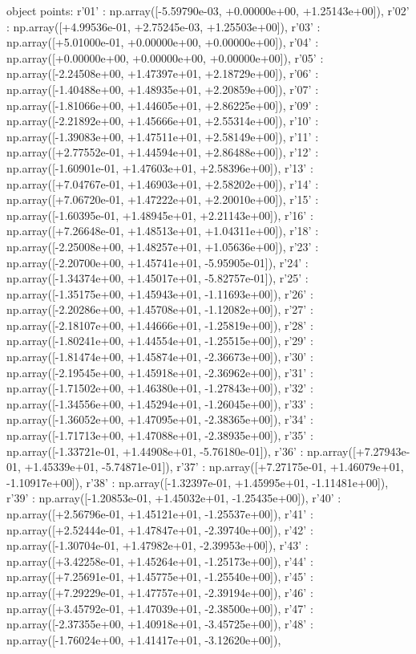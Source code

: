 object points:
r'01' : np.array([-5.59790e-03, +0.00000e+00, +1.25143e+00]),
r'02' : np.array([+4.99536e-01, +2.75245e-03, +1.25503e+00]),
r'03' : np.array([+5.01000e-01, +0.00000e+00, +0.00000e+00]),
r'04' : np.array([+0.00000e+00, +0.00000e+00, +0.00000e+00]),
r'05' : np.array([-2.24508e+00, +1.47397e+01, +2.18729e+00]),
r'06' : np.array([-1.40488e+00, +1.48935e+01, +2.20859e+00]),
r'07' : np.array([-1.81066e+00, +1.44605e+01, +2.86225e+00]),
r'09' : np.array([-2.21892e+00, +1.45666e+01, +2.55314e+00]),
r'10' : np.array([-1.39083e+00, +1.47511e+01, +2.58149e+00]),
r'11' : np.array([+2.77552e-01, +1.44594e+01, +2.86488e+00]),
r'12' : np.array([-1.60901e-01, +1.47603e+01, +2.58396e+00]),
r'13' : np.array([+7.04767e-01, +1.46903e+01, +2.58202e+00]),
r'14' : np.array([+7.06720e-01, +1.47222e+01, +2.20010e+00]),
r'15' : np.array([-1.60395e-01, +1.48945e+01, +2.21143e+00]),
r'16' : np.array([+7.26648e-01, +1.48513e+01, +1.04311e+00]),
r'18' : np.array([-2.25008e+00, +1.48257e+01, +1.05636e+00]),
r'23' : np.array([-2.20700e+00, +1.45741e+01, -5.95905e-01]),
r'24' : np.array([-1.34374e+00, +1.45017e+01, -5.82757e-01]),
r'25' : np.array([-1.35175e+00, +1.45943e+01, -1.11693e+00]),
r'26' : np.array([-2.20286e+00, +1.45708e+01, -1.12082e+00]),
r'27' : np.array([-2.18107e+00, +1.44666e+01, -1.25819e+00]),
r'28' : np.array([-1.80241e+00, +1.44554e+01, -1.25515e+00]),
r'29' : np.array([-1.81474e+00, +1.45874e+01, -2.36673e+00]),
r'30' : np.array([-2.19545e+00, +1.45918e+01, -2.36962e+00]),
r'31' : np.array([-1.71502e+00, +1.46380e+01, -1.27843e+00]),
r'32' : np.array([-1.34556e+00, +1.45294e+01, -1.26045e+00]),
r'33' : np.array([-1.36052e+00, +1.47095e+01, -2.38365e+00]),
r'34' : np.array([-1.71713e+00, +1.47088e+01, -2.38935e+00]),
r'35' : np.array([-1.33721e-01, +1.44908e+01, -5.76180e-01]),
r'36' : np.array([+7.27943e-01, +1.45339e+01, -5.74871e-01]),
r'37' : np.array([+7.27175e-01, +1.46079e+01, -1.10917e+00]),
r'38' : np.array([-1.32397e-01, +1.45995e+01, -1.11481e+00]),
r'39' : np.array([-1.20853e-01, +1.45032e+01, -1.25435e+00]),
r'40' : np.array([+2.56796e-01, +1.45121e+01, -1.25537e+00]),
r'41' : np.array([+2.52444e-01, +1.47847e+01, -2.39740e+00]),
r'42' : np.array([-1.30704e-01, +1.47982e+01, -2.39953e+00]),
r'43' : np.array([+3.42258e-01, +1.45264e+01, -1.25173e+00]),
r'44' : np.array([+7.25691e-01, +1.45775e+01, -1.25540e+00]),
r'45' : np.array([+7.29229e-01, +1.47757e+01, -2.39194e+00]),
r'46' : np.array([+3.45792e-01, +1.47039e+01, -2.38500e+00]),
r'47' : np.array([-2.37355e+00, +1.40918e+01, -3.45725e+00]),
r'48' : np.array([-1.76024e+00, +1.41417e+01, -3.12620e+00]),
